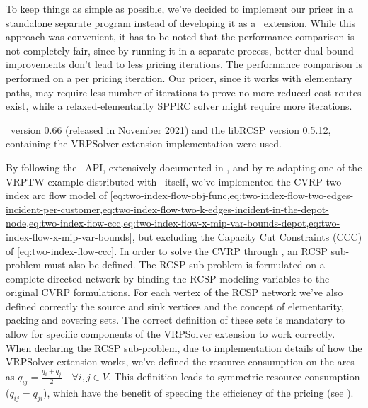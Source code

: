 To keep things as simple as possible, we've decided to implement our
pricer in a standalone separate program instead of developing it as a \bapcod\ extension.
While this approach was convenient, it has to be noted that the performance comparison is not
completely fair, since by running it in a separate process, better dual bound improvements
don't lead to less pricing iterations.
The performance comparison is performed on a per pricing iteration.
Our pricer, since it works with elementary paths, may require less number of iterations
to prove no-more reduced cost routes exist, while a relaxed-elementarity SPPRC solver
might require more iterations.

\bapcod\ version 0.66 (released in November 2021) and the libRCSP version 0.5.12,
containing the VRPSolver extension implementation were used.

By following the \bapcod\ API, extensively documented in \textcite{sadykov2021},
and by re-adapting one of the VRPTW example distributed with \bapcod\ itself,
we've implemented the CVRP two-index arc flow model
of \cref{eq:two-index-flow-obj-func,eq:two-index-flow-two-edges-incident-per-customer,eq:two-index-flow-two-k-edges-incident-in-the-depot-node,eq:two-index-flow-ccc,eq:two-index-flow-x-mip-var-bounds-depot,eq:two-index-flow-x-mip-var-bounds},
but excluding the Capacity Cut Constraints (CCC) of \cref{eq:two-index-flow-ccc}.
In order to solve the CVRP through \bapcod, an RCSP sub-problem must also be defined.
The RCSP sub-problem is formulated on a complete directed network by
binding the RCSP modeling variables to the original CVRP formulations.
For each vertex of the RCSP network we've also defined correctly the source
and sink vertices and the concept of elementarity, packing and covering sets.
The correct definition of these sets is mandatory to allow for specific
components of the VRPSolver extension to work correctly.
When declaring the RCSP sub-problem,
due to implementation details of how the VRPSolver extension works,
we've defined the resource consumption on the arcs as $q_{ij} = \frac{q_{i} + q_{j}}{2} \quad \forall i, j \in V$.
This definition leads to symmetric resource consumption ($q_{ij} = q_{ji}$),
which have the benefit of speeding the efficiency of the pricing (see \cite{pessoa2020a}).

